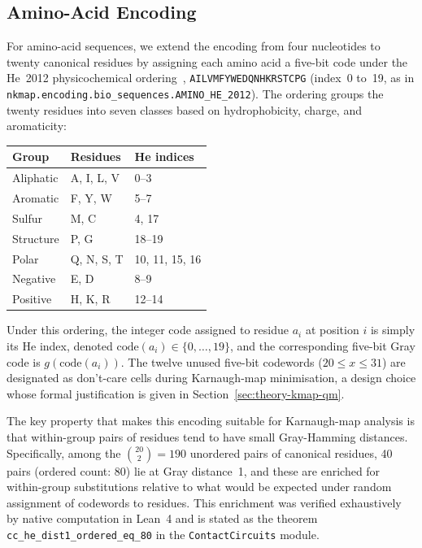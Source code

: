\subsection{Amino-Acid Encoding}
\label{sec:gray-amino}

For amino-acid sequences, we extend the encoding from four nucleotides to
twenty canonical residues by assigning each amino acid a five-bit code under
the He~2012 physicochemical ordering~\cite{he2012}, \texttt{AILVMFYWEDQNHKRSTCPG}
(index~0 to~19, as in \texttt{nkmap.encoding.bio\_sequences.AMINO\_HE\_2012}).  The ordering groups the
twenty residues into seven classes based on hydrophobicity, charge, and
aromaticity:
\begin{center}
	\begin{tabular}{lll}
		\toprule
		\textbf{Group} & \textbf{Residues} & \textbf{He indices} \\
		\midrule
		Aliphatic      & A, I, L, V        & 0--3                \\
		Aromatic       & F, Y, W           & 5--7                \\
		Sulfur         & M, C              & 4, 17               \\
		Structure      & P, G              & 18--19              \\
		Polar          & Q, N, S, T        & 10, 11, 15, 16      \\
		Negative       & E, D              & 8--9                \\
		Positive       & H, K, R           & 12--14              \\
		\bottomrule
	\end{tabular}
\end{center}
Under this ordering, the integer code assigned to residue $a_i$ at position
$i$ is simply its He index, denoted $\mathrm{code}(a_i) \in \{0, \ldots,
	19\}$, and the corresponding five-bit Gray code is $g(\mathrm{code}(a_i))$.
The twelve unused five-bit codewords ($20 \leq x \leq 31$) are designated as
don't-care cells during Karnaugh-map minimisation, a design choice whose
formal justification is given in Section~\ref{sec:theory-kmap-qm}.

The key property that makes this encoding suitable for Karnaugh-map analysis
is that within-group pairs of residues tend to have small Gray-Hamming
distances.  Specifically, among the $\binom{20}{2} = 190$ unordered pairs of
canonical residues, 40 pairs (ordered count: 80) lie at Gray distance~1, and
these are enriched for within-group substitutions relative to what would be
expected under random assignment of codewords to residues.  This enrichment
was verified exhaustively by native computation in Lean~4 and is stated as
the theorem \texttt{cc\_he\_dist1\_ordered\_eq\_80} in the
\texttt{ContactCircuits} module.

